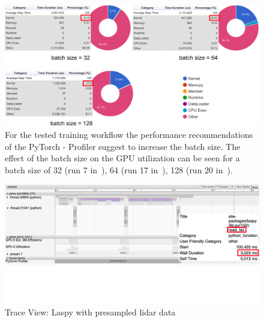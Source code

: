 \documentclass[12pt, a4paper, hidelinks]{article}
\begin{document}
\begin{figure}[H]
\centering
\includegraphics[width=1\textwidth]{./assets/scap_gtx1080_profiler-torch_comparison-batch-size}
\caption[PyTorch - Profiler: Performance Recommendation]{For the tested training workflow the performance recommendations of the PyTorch - Profiler suggest to increase the batch size. The effect of the batch size on the \ac{GPU} utilization can be seen for a batch size of 32 (run 7 in~), 64 (run 17 in~), 128 (run 20 in~).}
\label{fig:scap_gtx1080_profiler-torch_comparison-batch-size}
\end{figure}

\begin{figure}[H]
\centering
\includegraphics[width=1\textwidth]{./assets/scap_gtx1080_profiler-torch_batch-size-64_14650758_trace-view-laspy}
\caption*{Trace View: Laspy with presampled lidar data}
\label{fig:scap_gtx1080_profiler-torch_batch-size-64_14650758_trace-view-laspy}
\end{figure}
\end{document}

